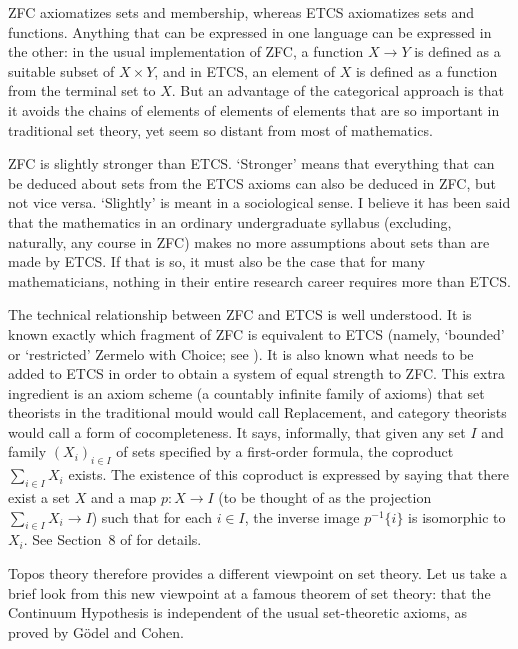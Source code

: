 \documentclass{article}
\newcommand{\cln}{\colon}
\begin{document}
ZFC axiomatizes sets and membership, whereas ETCS axiomatizes sets and
functions.  Anything that can be expressed in one language can be expressed in
the other: in the usual implementation of ZFC, a function $X \to Y$ is
defined as a suitable subset of $X \times Y$, and in ETCS, an element of $X$
is defined as a function from the terminal set to $X$.  But an advantage of
the categorical approach is that it avoids the chains of elements of elements
of elements that are so important in traditional set theory, yet
seem so distant from most of mathematics.

ZFC is slightly stronger than ETCS.  `Stronger' means that everything that can
be deduced about sets from the ETCS axioms can also be deduced in ZFC, but not
vice versa.  `Slightly' is meant in a sociological sense.  I believe it has
been said that the mathematics in an ordinary undergraduate syllabus
(excluding, naturally, any course in ZFC) makes no more assumptions about sets
than are made by ETCS.  If that is so, it must also be the case that for many
mathematicians, nothing in their entire research career requires more than
ETCS.

The technical relationship between ZFC and ETCS is well understood.  It is
known exactly which fragment of ZFC is equivalent to ETCS (namely, `bounded'
or `restricted' Zermelo with Choice; see \citet{MaMo}).  It is also known what
needs to be added to ETCS in order to obtain a system of equal strength to
ZFC.  This extra ingredient is an axiom scheme (a countably infinite family of
axioms) that set theorists in the traditional mould would call Replacement,
and category theorists would call a form of cocompleteness.  It says,
informally, that given any set $I$ and family $(X_i)_{i \in I}$ of sets
specified by a first-order formula, the coproduct $\sum_{i \in I} X_i$ exists.
The existence of this coproduct is expressed by saying that there exist a set
$X$ and a map $p\cln X \to I$ (to be thought of as the projection $\sum_{i \in
I} X_i \to I$) such that for each $i \in I$, the inverse image $p^{-1}\{i\}$
is isomorphic to $X_i$.  See Section~8 of \citet{McLECS} for details.

Topos theory therefore provides a different viewpoint on set theory.  Let us
take a brief look from this new viewpoint at a famous theorem of set theory:
that the Continuum Hypothesis is independent of the usual set-theoretic
axioms, as proved by G\"odel and Cohen.
\end{document}
